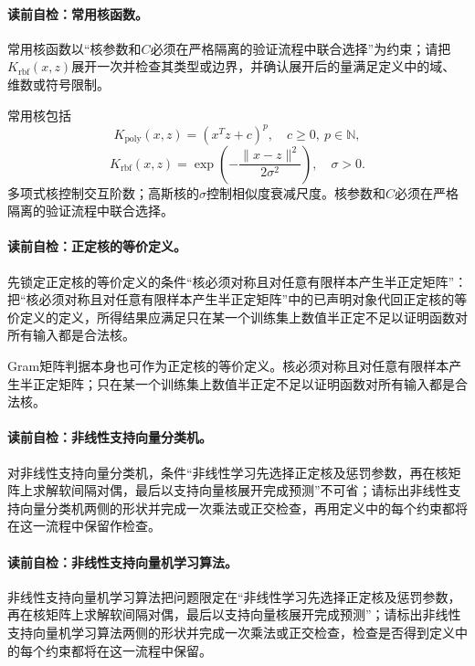 \paragraph{读前自检：常用核函数。}常用核函数以“核参数和$C$必须在严格隔离的验证流程中联合选择”为约束；请把$K_{\mathrm{rbf}}(x,z)$展开一次并检查其类型或边界，并确认展开后的量满足定义中的域、维数或符号限制。\par

常用核包括
\[
K_{\mathrm{poly}}(x,z)=(x^Tz+c)^p,\quad c\geq0,\ p\in\mathbb N,
\]
\[
K_{\mathrm{rbf}}(x,z)=\exp\!\left(-\frac{\lVert x-z\rVert^2}{2\sigma^2}\right),\quad\sigma>0.
\]
多项式核控制交互阶数；高斯核的$\sigma$控制相似度衰减尺度。核参数和$C$必须在严格隔离的验证流程中联合选择。

\paragraph{读前自检：正定核的等价定义。}先锁定正定核的等价定义的条件“核必须对称且对任意有限样本产生半正定矩阵”：把“核必须对称且对任意有限样本产生半正定矩阵”中的已声明对象代回正定核的等价定义的定义，所得结果应满足只在某一个训练集上数值半正定不足以证明函数对所有输入都是合法核。\par

Gram矩阵判据本身也可作为正定核的等价定义。核必须对称且对任意有限样本产生半正定矩阵；只在某一个训练集上数值半正定不足以证明函数对所有输入都是合法核。


\paragraph{读前自检：非线性支持向量分类机。}对非线性支持向量分类机，条件“非线性学习先选择正定核及惩罚参数，再在核矩阵上求解软间隔对偶，最后以支持向量核展开完成预测”不可省；请标出非线性支持向量分类机两侧的形状并完成一次乘法或正交检查，再用定义中的每个约束都将在这一流程中保留作检查。\par
\paragraph{读前自检：非线性支持向量机学习算法。}非线性支持向量机学习算法把问题限定在“非线性学习先选择正定核及惩罚参数，再在核矩阵上求解软间隔对偶，最后以支持向量核展开完成预测”；请标出非线性支持向量机学习算法两侧的形状并完成一次乘法或正交检查，检查是否得到定义中的每个约束都将在这一流程中保留。\par

